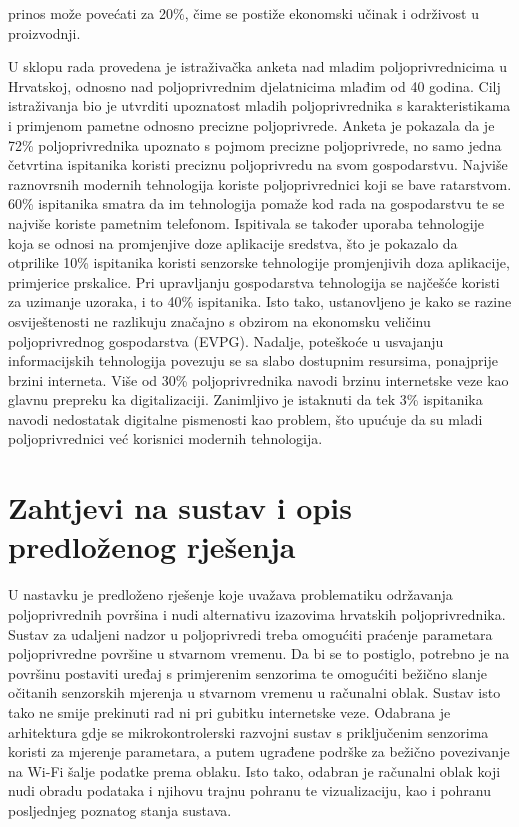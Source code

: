prinos može povećati za 20\%, čime se postiže ekonomski učinak i održivost u proizvodnji.

U sklopu rada \cite{arapovic} provedena je istraživačka anketa nad mladim poljoprivrednicima u Hrvatskoj, odnosno nad poljoprivrednim djelatnicima mlađim od 40 godina. Cilj istraživanja bio je utvrditi upoznatost mladih poljoprivrednika s karakteristikama i primjenom pametne odnosno precizne poljoprivrede. Anketa je pokazala da je 72\% poljoprivrednika upoznato s pojmom precizne poljoprivrede, no samo jedna četvrtina ispitanika koristi preciznu poljoprivredu na svom gospodarstvu. Najviše raznovrsnih modernih tehnologija koriste poljoprivrednici koji se bave ratarstvom. 60\% ispitanika smatra da im tehnologija pomaže kod rada na gospodarstvu te se najviše koriste pametnim telefonom. Ispitivala se također uporaba tehnologije koja se odnosi na promjenjive doze aplikacije sredstva, što je pokazalo da otprilike 10\% ispitanika koristi senzorske tehnologije promjenjivih doza aplikacije, primjerice prskalice. Pri upravljanju gospodarstva tehnologija se najčešće koristi za uzimanje uzoraka, i to 40\% ispitanika. Isto tako, ustanovljeno je kako se razine osviještenosti ne razlikuju značajno s obzirom na ekonomsku veličinu poljoprivrednog gospodarstva (EVPG). Nadalje, poteškoće u usvajanju informacijskih tehnologija povezuju se sa slabo dostupnim resursima, ponajprije brzini interneta. Više od 30\% poljoprivrednika navodi brzinu internetske veze kao glavnu prepreku ka digitalizaciji. Zanimljivo je istaknuti da tek 3\% ispitanika navodi nedostatak digitalne pismenosti kao problem, što upućuje da su mladi poljoprivrednici već korisnici modernih tehnologija. 

\section{Zahtjevi na sustav i opis predloženog rješenja}

U nastavku je predloženo rješenje koje uvažava problematiku održavanja poljoprivrednih površina i nudi alternativu izazovima hrvatskih poljoprivrednika. Sustav za udaljeni nadzor u poljoprivredi treba omogućiti praćenje parametara poljoprivredne površine u stvarnom vremenu. Da bi se to postiglo, potrebno je na površinu postaviti uređaj s primjerenim senzorima te omogućiti bežično slanje očitanih senzorskih mjerenja u stvarnom vremenu u računalni oblak. Sustav isto tako ne smije prekinuti rad ni pri gubitku internetske veze. Odabrana je arhitektura gdje se mikrokontrolerski razvojni sustav s priključenim senzorima koristi za mjerenje parametara, a putem ugrađene podrške za bežično povezivanje na Wi-Fi šalje podatke prema oblaku. Isto tako, odabran je računalni oblak koji nudi obradu podataka i njihovu trajnu pohranu te vizualizaciju, kao i pohranu posljednjeg poznatog stanja sustava.

